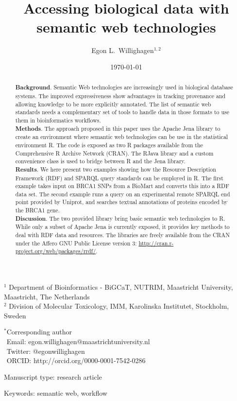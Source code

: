 \documentclass[12pt]{article}
\title{Accessing biological data with semantic web technologies}
\author{Egon L.\ Willighagen$^{1,2}$}
\begin{document}
\date{\today}
\maketitle

\noindent
$^1$ Department of Bioinformatics - BiGCaT, NUTRIM, Maastricht University, Maastricht, The Netherlands \\
$^2$ Division of Molecular Toxicology, IMM, Karolinska Institutet, Stockholm, Sweden

\bigskip
\noindent
$^*$Corresponding author\\
$\phantom{^*}$Email: egon.willighagen@maastrichtuniversity.nl\\
$\phantom{^*}$Twitter: @egonwillighagen\\
$\phantom{^*}$ORCID: http://orcid.org/0000-0001-7542-0286

\bigskip
\noindent
Manuscript type: research article

\bigskip
\noindent Keywords: semantic web, workflow

\newpage
\begin{abstract}
\noindent
\textbf{Background}. Semantic Web technologies are increasingly used in biological database systems.
The improved expressiveness show advantages in tracking provenance and allowing knowledge to be
more explicitly annotated. The list of semantic web standards needs a complementary set of tools to
handle data in those formats to use them in bioinformatics workflows. \\
\textbf{Methods}. The approach proposed in this paper uses the Apache Jena library to create an
environment where semantic web technologies can be use in the statistical environment R. The
code is exposed as two R packages available from the Comprehensive R Archive Network (CRAN). 
The RJava library and a custom convenience class is used to bridge between R and the Jena library.\\
\textbf{Results}. We here present two examples showing how the Resource Description Framework
(RDF) and SPARQL query standards can be employed in R. The first example takes input on BRCA1 SNPs
from a BioMart and converts this into a RDF data set. The second example runs a query on an
experimental remote SPARQL end point provided by Uniprot, and searches textual annotations of
proteins encoded by the BRCA1 gene. \\
\textbf{Discussion}. The two provided library bring basic semantic web technologies to R.
While only a subset of Apache Jena is currently exposed, it provides key methods to deal with
RDF data and resources. The libraries are freely available from the CRAN under the 
Affero GNU Public License version 3: \url{http://cran.r-project.org/web/packages/rrdf/}.
\end{abstract}
\end{document}
